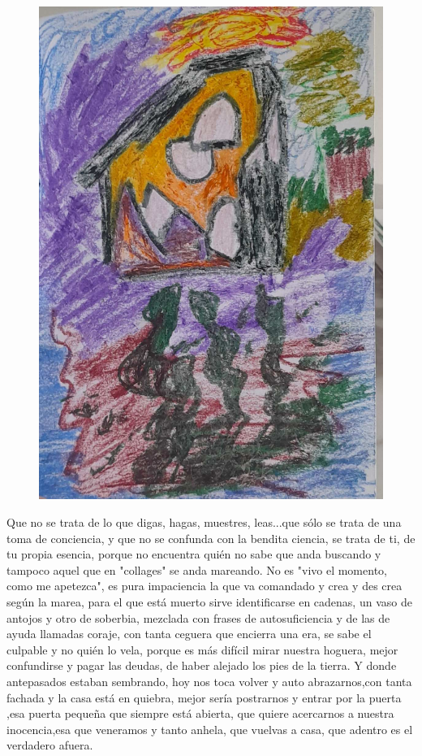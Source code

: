 \documentclass[12pt, a4paper, twoside]{book} %
\begin{document}
\begin{figure}[H]
	\centering
	\includegraphics[width=\textwidth]{./images/1f81324df38bf5.jpg}
\end{figure}

Que no se trata de lo que digas, hagas, muestres, leas...que sólo se trata de una toma de conciencia, y que no se confunda con la bendita ciencia, se trata de ti, de tu propia esencia, porque no encuentra quién no sabe que anda buscando y tampoco aquel que en "collages" se anda mareando. No es "vivo el momento, como me apetezca", es pura impaciencia la que va comandado y crea y des crea según la marea, para el que está muerto sirve identificarse en cadenas, un vaso de antojos y otro de soberbia, mezclada con frases de autosuficiencia y de las de ayuda llamadas coraje, con tanta ceguera que encierra una era, se sabe el culpable y no quién lo vela, porque es más difícil mirar nuestra hoguera, mejor confundirse y pagar las deudas, de haber alejado los pies de la tierra. Y  donde antepasados estaban sembrando, hoy nos toca volver y auto abrazarnos,con tanta fachada y la casa está en quiebra, mejor sería  postrarnos y entrar por la puerta ,esa puerta pequeña que siempre está abierta, que quiere acercarnos a nuestra inocencia,esa que veneramos y tanto anhela, que vuelvas a casa, que adentro es el verdadero afuera.
\end{document}
